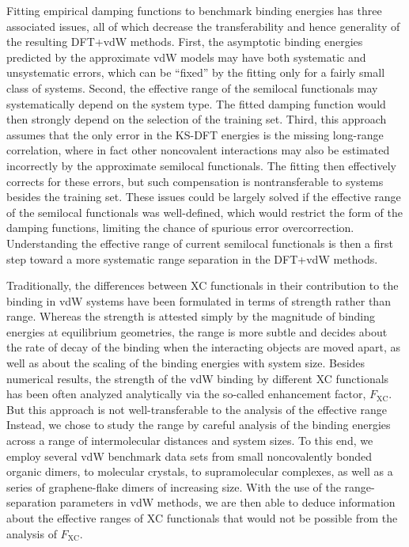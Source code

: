 Fitting empirical damping functions to benchmark binding energies has three associated issues, all of which decrease the transferability and hence generality of the resulting DFT+vdW methods.
First, the asymptotic binding energies predicted by the approximate vdW models may have both systematic and unsystematic errors, which can be ``fixed'' by the fitting only for a fairly small class of systems.
Second, the effective range of the semilocal functionals may systematically depend on the system type.
The fitted damping function would then strongly depend on the selection of the training set.
Third, this approach assumes that the only error in the KS-DFT energies is the missing long-range correlation, where in fact other noncovalent interactions may also be estimated incorrectly by the approximate semilocal functionals.
The fitting then effectively corrects for these errors, but such compensation is nontransferable to systems besides the training set.
These issues could be largely solved if the effective range of the semilocal functionals was well-defined, which would restrict the form of the damping functions, limiting the chance of spurious error overcorrection.
Understanding the effective range of current semilocal functionals is then a first step toward a more systematic range separation in the DFT+vdW methods.

Traditionally, the differences between XC functionals in their contribution to the binding in vdW systems have been formulated in terms of strength rather than range.
Whereas the strength is attested simply by the magnitude of binding energies at equilibrium geometries, the range is more subtle and decides about the rate of decay of the binding when the interacting objects are moved apart, as well as about the scaling of the binding energies with system size.
Besides numerical results, the strength of the vdW binding by different XC functionals has been often analyzed analytically via the so-called enhancement factor, $F_\text{XC}$.
But this approach is not well-transferable to the analysis of the effective range
Instead, we chose to study the range by careful analysis of the binding energies across a range of intermolecular distances and system sizes.
To this end, we employ several vdW benchmark data sets from small noncovalently bonded organic dimers, to molecular crystals, to supramolecular complexes, as well as a series of graphene-flake dimers of increasing size.
With the use of the range-separation parameters in vdW methods, we are then able to deduce information about the effective ranges of XC functionals that would not be possible from the analysis of $F_\text{XC}$.

